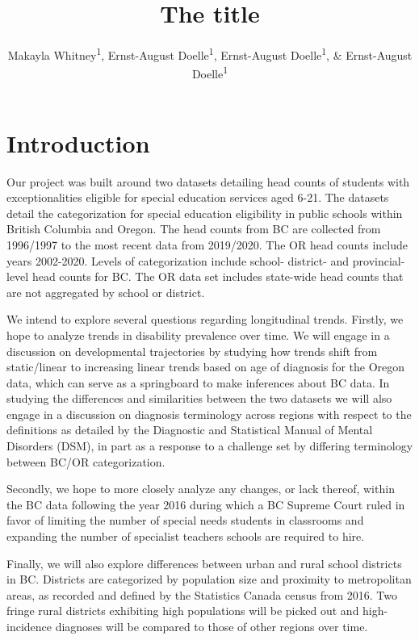 \documentclass[
  english,
  man]{apa6}
\title{The title}
\author{Makayla Whitney\textsuperscript{1}, Ernst-August Doelle\textsuperscript{1}, Ernst-August Doelle\textsuperscript{1}, \& Ernst-August Doelle\textsuperscript{1}}
\date{}
\affiliation{\vspace{0.5cm}\textsuperscript{1} University of Oregon}
\begin{document}
\maketitle

\hypertarget{introduction}{%
\section{Introduction}\label{introduction}}

Our project was built around two datasets detailing head counts of students with exceptionalities eligible for special education services aged 6-21. The datasets detail the categorization for special education eligibility in public schools within British Columbia and Oregon. The head counts from BC are collected from 1996/1997 to the most recent data from 2019/2020. The OR head counts include years 2002-2020. Levels of categorization include school- district- and provincial-level head counts for BC. The OR data set includes state-wide head counts that are not aggregated by school or district.

We intend to explore several questions regarding longitudinal trends. Firstly, we hope to analyze trends in disability prevalence over time. We will engage in a discussion on developmental trajectories by studying how trends shift from static/linear to increasing linear trends based on age of diagnosis for the Oregon data, which can serve as a springboard to make inferences about BC data. In studying the differences and similarities between the two datasets we will also engage in a discussion on diagnosis terminology across regions with respect to the definitions as detailed by the Diagnostic and Statistical Manual of Mental Disorders (DSM), in part as a response to a challenge set by differing terminology between BC/OR categorization.

Secondly, we hope to more closely analyze any changes, or lack thereof, within the BC data following the year 2016 during which a BC Supreme Court ruled in favor of limiting the number of special needs students in classrooms and expanding the number of specialist teachers schools are required to hire.

Finally, we will also explore differences between urban and rural school districts in BC. Districts are categorized by population size and proximity to metropolitan areas, as recorded and defined by the Statistics Canada census from 2016. Two fringe rural districts exhibiting high populations will be picked out and high-incidence diagnoses will be compared to those of other regions over time.
\end{document}
